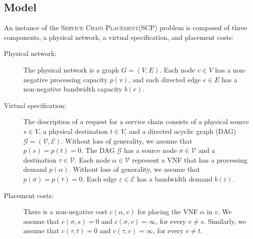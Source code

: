 \documentclass[11pt]{article}
\newcommand{\eps}{\varepsilon}
\newcommand{\scp}{\textsc{SCP}\xspace}
\newcommand{\scplong}{\textsc{Service Chain Placement}\xspace}
\newcommand{\calE}{\mathcal{E}}
\newcommand{\calG}{\mathcal{G}}
\newcommand{\calV}{\mathcal{V}}
\begin{document}
\subsection{Model}
%
An instance of the \scplong (\scp) problem is composed of three
components, a physical network, a virtual specification, and placement
costs:
\begin{description}
\item[Physical network:]
%
  The physical network is a graph $G = (V,E)$.  Each node $v \in V$
  has a non-negative processing capacity $p(v)$, and each directed
  edge $e \in E$ has a non-negative bandwidth capacity $b(e)$.
%

\medskip
  
\item[Virtual specification:]
%
  The description of a request for a service chain consists of a
  physical source $s \in V$, a physical destination $t \in V$, and a
  directed acyclic graph (DAG) $\calG = (\calV,\calE)$.
%
  Without loss of generality, we assume that $p(s) = p(t) = 0$.  
%
  The DAG $\calG$ has a source node $\sigma \in \calV$ and a
  destination $\tau \in \calV$. Each node $\alpha \in \calV$ represent
  a VNF that has a processing demand $p(\alpha)$.
%
  Without loss of generality, we assume that $p(\sigma) = p(\tau) =
  0$.  Each edge $\eps \in \calE$ has a bandwidth demand $b(\eps)$.

\medskip
  
\item[Placement costs:]
%
  There is a non-negative cost $c(\alpha,v)$ for placing the VNF
  $\alpha$ in $v$.  We assume that $c(\sigma,s) = 0$ and $c(\sigma,v)
  = \infty$, for every $v \neq s$.  Similarly, we assume that
  $c(\tau,t) = 0$ and $c(\tau,v) = \infty$, for every $v \neq t$.
\end{description}
\end{document}

